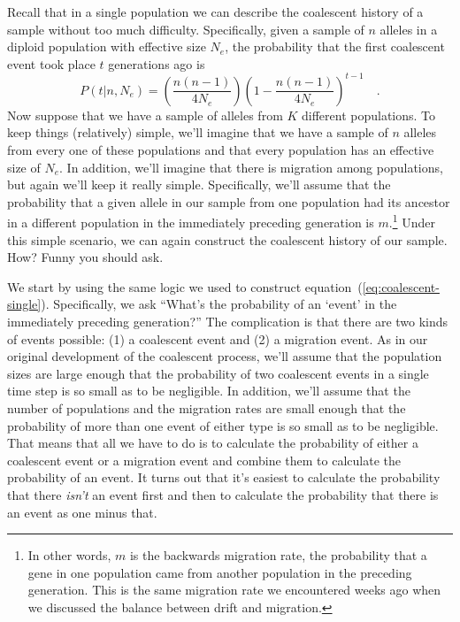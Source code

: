 Recall that in a single population we can describe the coalescent
history of a sample without too much difficulty. Specifically, given a
sample of $n$ alleles in a diploid population with effective size
$N_e$, the probability that the first coalescent event took place $t$
generations ago is
\begin{equation}
P(t|n, N_e) = \left(\frac{n(n-1)}{4N_e}\right)\left(1-
  \frac{n(n-1)}{4N_e}\right)^{t-1} \quad . \label{eq:coalescent-single}
\end{equation}
Now suppose that we have a sample of alleles from $K$ different
populations. To keep things (relatively) simple, we'll imagine that we
have a sample of $n$ alleles from every one of these populations and
that every population has an effective size of $N_e$. In addition,
we'll imagine that there is migration among populations, but again
we'll keep it really simple. Specifically, we'll assume that the
probability that a given allele in our sample from one population had
its ancestor in a different population in the immediately preceding
generation is $m$.\footnote{In other words, $m$ is the backwards
  migration rate, the probability that a gene in one population came
  from another population in the preceding generation. This is the
  same migration rate we encountered weeks ago when we discussed the
  balance between drift and migration.} Under this simple scenario, we
can again construct the coalescent history of our sample. How? Funny
you should ask.

We start by using the same logic we used to construct
equation~(\ref{eq:coalescent-single}). Specifically, we ask ``What's
the probability of an `event' in the immediately preceding
generation?'' The complication is that there are two kinds of events
possible: (1) a coalescent event and (2) a migration event. As in our
original development of the coalescent process, we'll assume that the
population sizes are large enough that the probability of two
coalescent events in a single time step is so small as to be
negligible. In addition, we'll assume that the number of populations
and the migration rates are small enough that the probability of more
than one event of either type is so small as to be negligible. That
means that all we have to do is to calculate the probability of either
a coalescent event or a migration event and combine them to calculate
the probability of an event. It turns out that it's easiest to
calculate the probability that there {\it isn't\/} an event first and
then to calculate the probability that there is an event as one minus
that.

